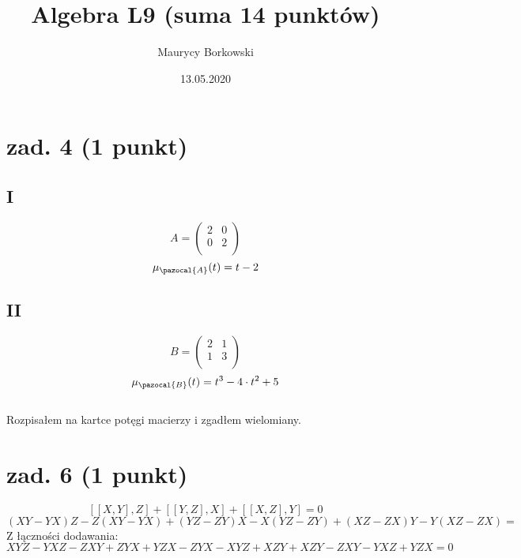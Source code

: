 \documentclass{article}
\title{Algebra L9 (suma 14 punktów)}
\date{13.05.2020}
\author{Maurycy Borkowski}
\begin{document}
\maketitle
\section{zad. 4 (1 punkt)}
\subsection*{I}
$$
A=
\begin{pmatrix}
2 & 0 \\
0 & 2 \\
\end{pmatrix}
$$
$$
\mu_{\pazocal{A}}(t) = t-2
$$
\subsection*{II}
$$
B=
\begin{pmatrix}
2 & 1 \\
1 & 3 \\
\end{pmatrix}
$$
$$
\mu_{\pazocal{B}}(t) = t^3-4\cdot t^2 + 5
$$
\\Rozpisałem na kartce potęgi macierzy i zgadłem wielomiany.
\section{zad. 6 (1 punkt)}
$$
[[X, Y], Z] + [[Y, Z],X] + [[X, Z], Y] = 0
$$
$$
(XY-YX)Z - Z(XY-YX) + (YZ-ZY)X - X(YZ-ZY) + (XZ-ZX)Y - Y(XZ-ZX) =
$$
Z łączności dodawania:
$$
XYZ -YXZ - ZXY + ZYX + YZX -ZYX - XYZ + XZY + XZY - ZXY -YXZ + YZX = 0
$$\\\\
\end{document}
